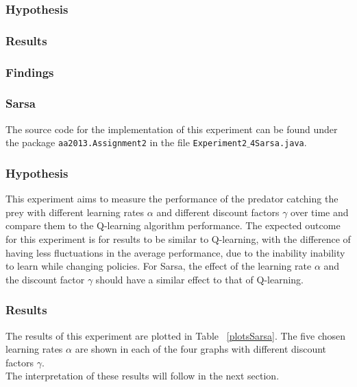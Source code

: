 \documentclass[11pt]{article}
\begin{document}
\subsubsection{Hypothesis}




\subsubsection{Results}



\subsubsection{Findings}




\subsubsection{Sarsa}
The source code for the implementation of this experiment can be found under the package \texttt{aa2013.Assignment2} in the file \texttt{Experiment2$\_$4Sarsa.java}.


\subsubsection{Hypothesis}
This experiment aims to measure the performance of the predator catching the prey with different learning rates $\alpha$ and different discount factors $\gamma$ over time and compare them to the Q-learning algorithm performance. The expected outcome for this experiment is for results to be similar to Q-learning, with the difference of having less fluctuations in the average performance, due to the inability inability to learn while changing policies. For Sarsa, the effect of the learning rate $\alpha$ and the discount factor $\gamma$ should have a similar effect to that of Q-learning.



\subsubsection{Results}
The results of this experiment are plotted in Table ~\ref{plotsSarsa}. The five chosen learning rates $\alpha$ are shown in each of the four graphs with different discount factors $\gamma$.\\
The interpretation of these results will follow in the next section.
\end{document}

